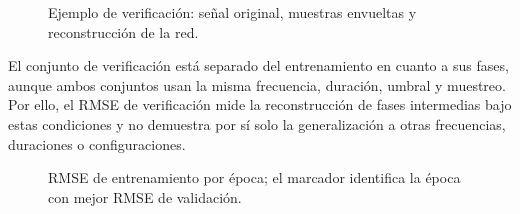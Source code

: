 \documentclass[12pt,a4paper]{article}
\begin{document}
\begin{figure}[H]
  \centering
  
  \caption{Ejemplo de verificación: señal original, muestras envueltas y reconstrucción de la red.}
  \label{fig:reconstruction}
\end{figure}

El conjunto de verificación está separado del entrenamiento en cuanto a sus fases, aunque ambos conjuntos usan la misma frecuencia, duración, umbral y muestreo. Por ello, el RMSE de verificación mide la reconstrucción de fases intermedias bajo estas condiciones y no demuestra por sí solo la generalización a otras frecuencias, duraciones o configuraciones.

\begin{figure}[H]
  \centering
  
  \caption{RMSE de entrenamiento por época; el marcador identifica la época con mejor RMSE de validación.}
  \label{fig:training-rmse}
\end{figure}
\end{document}
